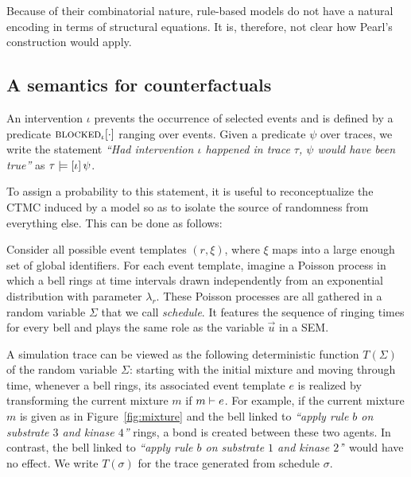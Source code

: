 Because of their combinatorial nature, rule-based models do not have a natural encoding in terms of structural equations. It is, therefore, not clear how Pearl's construction would apply.

\subsection{A semantics for counterfactuals}
\label{subsec:counterfactuals-semantics}

An intervention $\iota$ prevents the occurrence of selected events and
is defined by a predicate ${\textsc{blocked}}_{\iota}[\cdot]$ ranging over
events. 
Given a predicate $\psi$ over traces, we write the statement
\textit{``Had intervention $\iota$ happened in trace $\tau$, $\psi$
  would have been true''} as $\tau \models [\iota] \, \psi{}$.

To assign a probability to this statement, it is useful to
reconceptualize the CTMC induced by a model so as to isolate the
source of randomness from everything else. This can be done as follows:
\begin{inparaenum}[(i)]
\item Consider all possible event templates $(r, \xi)$, where $\xi$
maps into a large enough set of global identifiers. For each event template,
imagine a Poisson process in which a bell rings at time intervals drawn independently from an
exponential distribution with parameter $\lambda_r$. These Poisson processes are
all gathered in a random variable $\Sigma$ that we call \emph{schedule}. It
features the sequence of ringing times for every bell and plays the same role as
the variable $\vec{u}$ in a SEM.
\item A simulation trace can be viewed as the following deterministic
function $T(\Sigma)$ of the random variable $\Sigma$: starting with the initial mixture and moving through time,
whenever a bell rings, its associated event template $e$ is realized by
transforming the current mixture $m$ if $m \vdash e$. For example, if
the current mixture $m$ is given as in Figure~\ref{fig:mixture} and the bell
linked to \textit{``apply rule $b$ on substrate $3$ and kinase $4$''}
rings, a bond is created between these two agents. In contrast, the bell
linked to \textit{``apply rule $b$ on substrate $1$ and kinase $2$'}'
would have no effect. We write $T(\sigma)$ for the trace generated from schedule $\sigma$.
\end{inparaenum}

